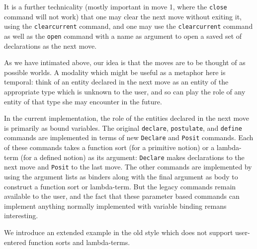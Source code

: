 \documentclass[12pt]{article}
\begin{document}
It is a further technicality (mostly important in move 1, where the {\tt close} command will not work) that one may clear the next move without exiting it, using the {\tt clearcurrent} command, and one may use the {\tt clearcurrent} command as well as the {\tt open} command with a name as argument to open a saved set of declarations as the next move.

As we have intimated above, our idea is that the moves are to be thought of as possible worlds.  A modality which might be useful as a metaphor here is temporal:  think of an entity declared in the next move as an entity of the appropriate type which is unknown to the user, and so can play the role of any entity of that type she may encounter in the future.

In the current implementation, the role of the entities declared in the next move is primarily as bound variables.  The original {\tt declare}, {\tt postulate}, and {\tt define}
commands are implemented in terms of new {\tt Declare} and {\tt Posit} commands.  Each of these commands takes a function sort (for a primitive notion) or a lambda-term (for a defined notion) as its argument:  {\tt Declare} makes declarations to the next move and {\tt Posit} to the last move.  The other commands are implemented by using the argument
lists as binders along with the final argument as body to construct a function sort or lambda-term.  But the legacy commands remain available to the user, and the fact that these parameter based commands can implement anything normally implemented with variable binding remans interesting.

We introduce an extended example in the old style which does not support user-entered function sorts and lambda-terms.
\end{document}
